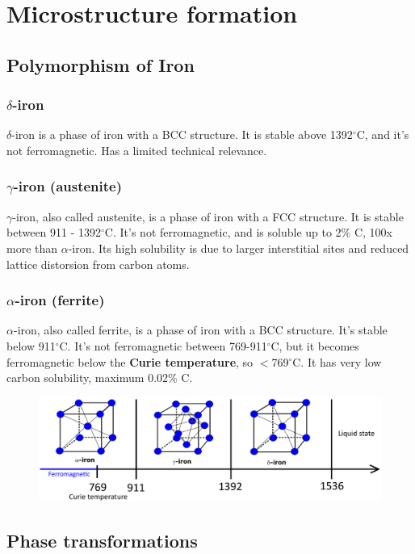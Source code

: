 \documentclass{article}
\begin{document}
\section{Microstructure formation}
\subsection{Polymorphism of Iron}
\subsubsection{$\delta$-iron}
$\delta$-iron is a phase of iron with a BCC structure. It is stable above 1392$^\circ$C, and
it's not ferromagnetic. Has a limited technical relevance.

\subsubsection{$\gamma$-iron (austenite)}
$\gamma$-iron, also called austenite, is a phase of iron with a FCC structure.
It is stable between 911 - 1392$^\circ$C. It's not ferromagnetic, and is soluble up
to 2\% C, 100x more than $\alpha$-iron. Its high solubility is due to larger interstitial
sites and reduced lattice distorsion from carbon atoms.

\subsubsection{$\alpha$-iron (ferrite)}
$\alpha$-iron, also called ferrite, is a phase of iron with a BCC structure.
It's stable below 911$^\circ$C. It's not ferromagnetic between 769-911$^\circ$C, but it
becomes ferromagnetic below the \textbf{Curie temperature}, so $<$769$^\circ$C.
It has very low carbon solubility, maximum 0.02\% C.

\begin{figure}[ht!]
  \centering
  \includegraphics[width=\textwidth]{media/iron_polymorphism.png}
\end{figure}

\newpage
\subsection{Phase transformations}
\end{document}

